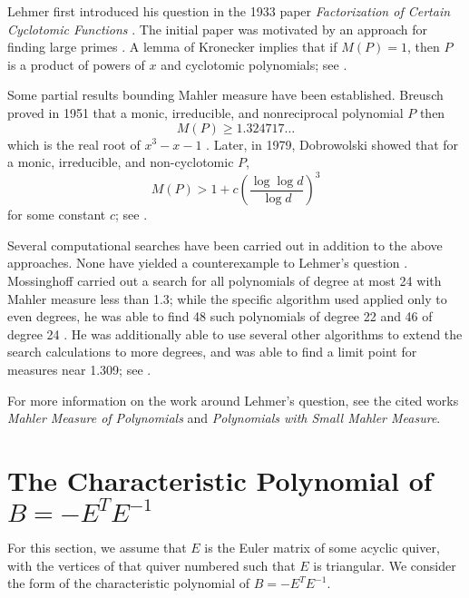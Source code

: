\documentclass{amsart}
\theoremstyle{theorem}
\theoremstyle{theorem*}
\theoremstyle{definition}
\begin{document}
Lehmer first introduced his question in the 1933 paper \textit{Factorization of
    Certain Cyclotomic Functions} \cite{l}. The initial paper was motivated by
an approach for finding large primes \cite{ln}. A lemma of Kronecker implies
that if $M(P) = 1$, then $P$ is a product of powers of $x$ and cyclotomic
polynomials; see \cite{ln}.

Some partial results bounding Mahler measure have been established. Breusch
proved in 1951 that a monic, irreducible, and nonreciprocal polynomial $P$ then
$$M(P) \geq 1.324717\dots$$ which is the real root of $x^3 - x - 1$ \cite{ln}.
Later, in 1979, Dobrowolski showed that for a monic, irreducible, and
non-cyclotomic $P$,
$$M(P) > 1 + c \left(\frac{\log \log d}{\log d}\right)^3$$ for some constant $c$;
see \cite{ln}.

Several computational searches have been carried out in addition to the above
approaches. None have yielded a counterexample to Lehmer's question \cite{m}.
Mossinghoff carried out a search for all polynomials of degree at most 24 with
Mahler measure less than 1.3; while the specific algorithm used applied only to
even degrees, he was able to find 48 such polynomials of degree 22 and 46 of
degree 24 \cite{m}. He was additionally able to use several other algorithms to
extend the search calculations to more degrees, and was able to find a limit
point for measures near 1.309; see \cite{m}.

For more information on the work around Lehmer's question, see the cited works
\textit{Mahler Measure of Polynomials} and \textit{Polynomials with Small Mahler
    Measure}.

\section{The Characteristic Polynomial of $B = -E^T E^{-1}$}

For this section, we assume that $E$ is the Euler matrix of some acyclic quiver,
with the vertices of that quiver numbered such that $E$ is triangular. We consider
the form of the characteristic polynomial of $B = - E^T E^{-1}$.
\end{document}
